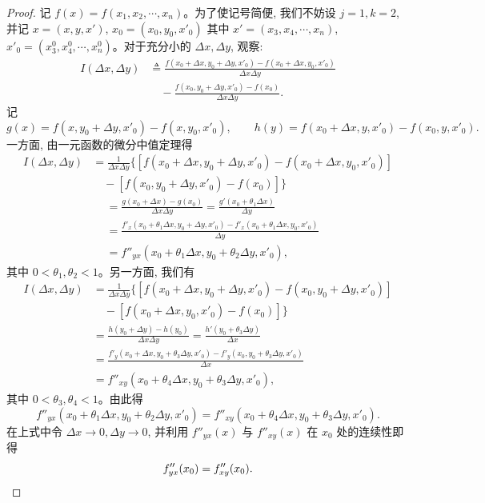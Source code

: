 \begin{proof}
记 $f(x)=f(x_1,x_2,\cdots,x_n)$。为了使记号简便, 我们不妨设 $j=1,k=2$, 并记 $x=(x,y,x')$, $x_0=(x_0,y_0,x'_0)$ 其中 $x'=(x_3,x_4,\cdots,x_n)$, $x'_0=(x_3^0,x_4^0,\cdots,x_n^0)$。对于充分小的 $\Delta x,\Delta y$, 观察:
\[
\begin{aligned}
  I(\Delta x,\Delta y)
  &\triangleq
  \frac{f(x_0+\Delta x,y_0+\Delta y,x'_0)-f(x_0+\Delta x,y_0,x'_0)}{\Delta x\Delta y}\\
  &\quad-\frac{f(x_0,y_0+\Delta y,x'_0)-f(x_0)}{\Delta x\Delta y}.
\end{aligned}
\]
记
\[
  g(x)=f(x,y_0+\Delta y,x'_0)-f(x,y_0,x'_0),
  \qquad
  h(y)=f(x_0+\Delta x,y,x'_0)-f(x_0,y,x'_0).
\]
一方面, 由一元函数的微分中值定理得
\[
\begin{aligned}
  I(\Delta x,\Delta y)
  &=\frac1{\Delta x\Delta y}
  \{[f(x_0+\Delta x,y_0+\Delta y,x'_0)-f(x_0+\Delta x,y_0,x'_0)]\\
  &\quad-[f(x_0,y_0+\Delta y,x'_0)-f(x_0)]\}
\end{aligned}
\]
\[
\begin{aligned}
  &=\frac{g(x_0+\Delta x)-g(x_0)}{\Delta x\Delta y}
  =\frac{g'(x_0+\theta_1\Delta x)}{\Delta y}\\
  &=\frac{f'_x(x_0+\theta_1\Delta x,y_0+\Delta y,x'_0)
  -f'_x(x_0+\theta_1\Delta x,y_0,x'_0)}{\Delta y}\\
  &=f''_{yx}(x_0+\theta_1\Delta x,y_0+\theta_2\Delta y,x'_0),
\end{aligned}
\]
其中 $0<\theta_1,\theta_2<1$。另一方面, 我们有
\[
\begin{aligned}
  I(\Delta x,\Delta y)
  &=\frac1{\Delta x\Delta y}
  \{[f(x_0+\Delta x,y_0+\Delta y,x'_0)-f(x_0,y_0+\Delta y,x'_0)]\\
  &\quad-[f(x_0+\Delta x,y_0,x'_0)-f(x_0)]\}\\
  &=\frac{h(y_0+\Delta y)-h(y_0)}{\Delta x\Delta y}
  =\frac{h'(y_0+\theta_3\Delta y)}{\Delta x}\\
  &=\frac{f'_y(x_0+\Delta x,y_0+\theta_3\Delta y,x'_0)
  -f'_y(x_0,y_0+\theta_3\Delta y,x'_0)}{\Delta x}\\
  &=f''_{xy}(x_0+\theta_4\Delta x,y_0+\theta_3\Delta y,x'_0),
\end{aligned}
\]
其中 $0<\theta_3,\theta_4<1$。由此得
\[
  f''_{yx}(x_0+\theta_1\Delta x,y_0+\theta_2\Delta y,x'_0)
  =f''_{xy}(x_0+\theta_4\Delta x,y_0+\theta_3\Delta y,x'_0).
\]
在上式中令 $\Delta x\to0,\Delta y\to0$, 并利用 $f''_{yx}(x)$ 与 $f''_{xy}(x)$ 在 $x_0$ 处的连续性即得
\[
  f''_{yx}(x_0)=f''_{xy}(x_0).
\qedhere
\]
\end{proof}


